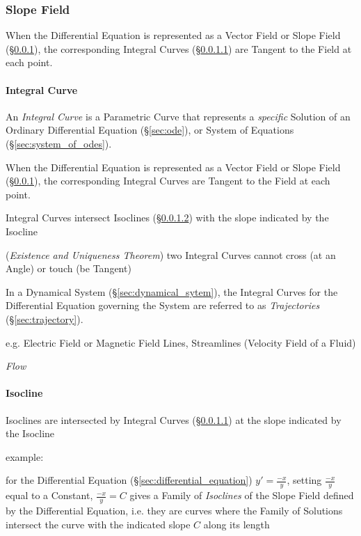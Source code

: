 \subsubsection{Slope Field}\label{sec:slope_field}

When the Differential Equation is represented as a Vector Field or Slope Field
(\S\ref{sec:slope_field}), the corresponding Integral Curves
(\S\ref{sec:integral_curve}) are Tangent to the Field at each point.



\paragraph{Integral Curve}\label{sec:integral_curve}\hfill

An \emph{Integral Curve} is a Parametric Curve that represents a
\emph{specific} Solution of an Ordinary Differential Equation
(\S\ref{sec:ode}), or System of Equations (\S\ref{sec:system_of_odes}).

When the Differential Equation is represented as a Vector Field or Slope Field
(\S\ref{sec:slope_field}), the corresponding Integral Curves are Tangent to the
Field at each point.

Integral Curves intersect Isoclines (\S\ref{sec:isocline}) with the slope
indicated by the Isocline

(\emph{Existence and Uniqueness Theorem}) two Integral Curves cannot cross (at
an Angle) or touch (be Tangent)

In a Dynamical System (\S\ref{sec:dynamical_sytem}), the Integral Curves for
the Differential Equation governing the System are referred to as
\emph{Trajectories} (\S\ref{sec:trajectory}).

e.g. Electric Field or Magnetic Field Lines, Streamlines (Velocity Field of a
Fluid)

\emph{Flow}



\paragraph{Isocline}\label{sec:isocline}\hfill

Isoclines are intersected by Integral Curves (\S\ref{sec:integral_curve}) at
the slope indicated by the Isocline

example:

for the Differential Equation (\S\ref{sec:differential_equation}) $y' =
\frac{-x}{y}$, setting $\frac{-x}{y}$ equal to a Constant, $\frac{-x}{y} = C$
gives a Family of \emph{Isoclines} of the Slope Field defined by the
Differential Equation, i.e. they are curves where the Family of Solutions
intersect the curve with the indicated slope $C$ along its length



